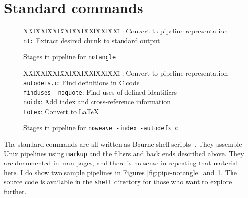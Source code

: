 \documentclass{article}
\newcommand\ltxlabel{\relax}
\let\ltxlabel=\label
\renewcommand\label{{\rm\it label\/}}
\begin{document}
\section{Standard commands}


\begin{figure}[t]
\noindent
\begin{tabbing}
XXl\=XXl\=XXl\=XXl\=XXl\=XXl\=XXl\=XXl\={}\kill
\>: Convert to pipeline representation\+\\
{\tt nt:} Extract desired chunk to standard output
\end{tabbing}
\caption{Stages in pipeline for {\tt notangle}}
\ltxlabel{fig:pipe-notangle}

\noindent
\begin{tabbing}
XXl\=XXl\=XXl\=XXl\=XXl\=XXl\=XXl\=XXl\={}\kill
\>: Convert to pipeline representation\+\\
{\tt autodefs.c}: Find definitions in C code\+\\
{\tt finduses -noquote}: Find uses of defined identifiers\+\\
{\tt noidx}: Add index and cross-reference information\+\\
{\tt totex}: Convert to {\LaTeX}
\end{tabbing}
\caption{Stages in pipeline for {\tt noweave -index -autodefs c}}
\ltxlabel{fig:pipe-noweave}
\end{figure}


The standard commands are all written as Bourne shell scripts~\cite{kernighan:unix}.
They assemble Unix pipelines using {\tt markup} and the filters and
back ends described above.  They are documented in man pages, and
there is no sense in repeating that material here.
I do show two sample pipelines in
Figures \ref{fig:pipe-notangle}~and~\ref{fig:pipe-noweave}.
The source code is available in the {\tt shell} directory for those
who want to explore further.
\end{document}
